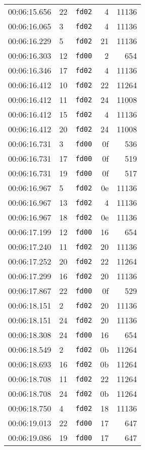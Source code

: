 \documentclass{article}
\begin{document}
\begin{longtable}{lllrr}
00:06:15.656 & 22 & \texttt{fd02} & 4 & 11136 \\
00:06:16.065 & 3 & \texttt{fd02} & 4 & 11136 \\
00:06:16.229 & 5 & \texttt{fd02} & 21 & 11136 \\
00:06:16.303 & 12 & \texttt{fd00} & 2 & 654 \\
00:06:16.346 & 17 & \texttt{fd02} & 4 & 11136 \\
00:06:16.412 & 10 & \texttt{fd02} & 22 & 11264 \\
00:06:16.412 & 11 & \texttt{fd02} & 24 & 11008 \\
00:06:16.412 & 15 & \texttt{fd02} & 4 & 11136 \\
00:06:16.412 & 20 & \texttt{fd02} & 24 & 11008 \\
00:06:16.731 & 3 & \texttt{fd00} & 0f & 536 \\
00:06:16.731 & 17 & \texttt{fd00} & 0f & 519 \\
00:06:16.731 & 19 & \texttt{fd00} & 0f & 517 \\
00:06:16.967 & 5 & \texttt{fd02} & 0e & 11136 \\
00:06:16.967 & 13 & \texttt{fd02} & 4 & 11136 \\
00:06:16.967 & 18 & \texttt{fd02} & 0e & 11136 \\
00:06:17.199 & 12 & \texttt{fd00} & 16 & 654 \\
00:06:17.240 & 11 & \texttt{fd02} & 20 & 11136 \\
00:06:17.252 & 20 & \texttt{fd02} & 22 & 11264 \\
00:06:17.299 & 16 & \texttt{fd02} & 20 & 11136 \\
00:06:17.867 & 22 & \texttt{fd00} & 0f & 529 \\
00:06:18.151 & 2 & \texttt{fd02} & 20 & 11136 \\
00:06:18.151 & 24 & \texttt{fd02} & 20 & 11136 \\
00:06:18.308 & 24 & \texttt{fd00} & 16 & 654 \\
00:06:18.549 & 2 & \texttt{fd02} & 0b & 11264 \\
00:06:18.693 & 16 & \texttt{fd02} & 0b & 11264 \\
00:06:18.708 & 11 & \texttt{fd02} & 22 & 11264 \\
00:06:18.708 & 24 & \texttt{fd02} & 0b & 11264 \\
00:06:18.750 & 4 & \texttt{fd02} & 18 & 11136 \\
00:06:19.013 & 22 & \texttt{fd00} & 17 & 647 \\
00:06:19.086 & 19 & \texttt{fd00} & 17 & 647 \\

\end{longtable}
\end{document}
